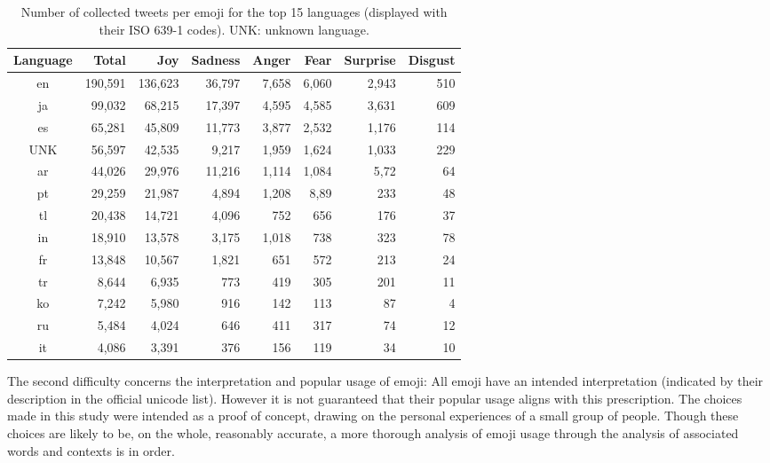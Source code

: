 \documentclass[10pt, a4paper]{article}
\begin{document}
\begin{table*}[!ht]
\centering
	\begin{tabular}{c | r | r | r | r | r | r | r}
\textbf{Language} & \textbf{Total} & \textbf{Joy} & \textbf{Sadness} & \textbf{Anger} & \textbf{Fear} & \textbf{Surprise} & \textbf{Disgust}  \\\hline
en  & 190,591 & 136,623 & 36,797 & 7,658 & 6,060 & 2,943 & 510 \\
ja  & 99,032 & 68,215 & 17,397 & 4,595 & 4,585 & 3,631 & 609 \\
es  & 65,281 & 45,809 & 11,773 & 3,877 & 2,532 & 1,176 & 114 \\
UNK  & 56,597 & 42,535 & 9,217 & 1,959 & 1,624 & 1,033 & 229\\
ar  & 44,026 & 29,976 & 11,216 & 1,114 & 1,084 & 5,72 & 64 \\
pt  & 29,259 & 21,987 & 4,894 & 1,208 & 8,89 & 233 & 48 \\
tl  & 20,438 & 14,721 & 4,096 & 752 & 656 & 176 & 37 \\
in  & 18,910 & 13,578 & 3,175 & 1,018 & 738 & 323 & 78 \\
fr  & 13,848 & 10,567 & 1,821 & 651 & 572 & 213 & 24\\
tr  & 8,644 & 6,935 & 773 & 419 & 305 & 201 & 11\\
ko  & 7,242 & 5,980 & 916 & 142 & 113 & 87 & 4\\
ru  & 5,484 & 4,024 & 646 & 411 & 317 & 74 & 12\\
it  & 4,086 & 3,391 & 376 & 156 & 119 & 34 & 10 \\
\end{tabular}
	\caption{Number of collected tweets per emoji for the top 15 languages (displayed with their ISO 639-1 codes). UNK: unknown language.}
	\label{tab:top-ten-langs}
\end{table*}

The second difficulty concerns the interpretation and popular usage of emoji: All emoji have an intended interpretation (indicated by their description in the official unicode list). However it is not guaranteed that their popular usage aligns with this prescription.
The choices made in this study were intended as a proof of concept, drawing on the personal experiences of a small group of people. 
Though these choices are likely to be, on the whole, reasonably accurate, a more thorough analysis of 
emoji usage through the analysis of associated words and contexts is in order. 
\end{document}
